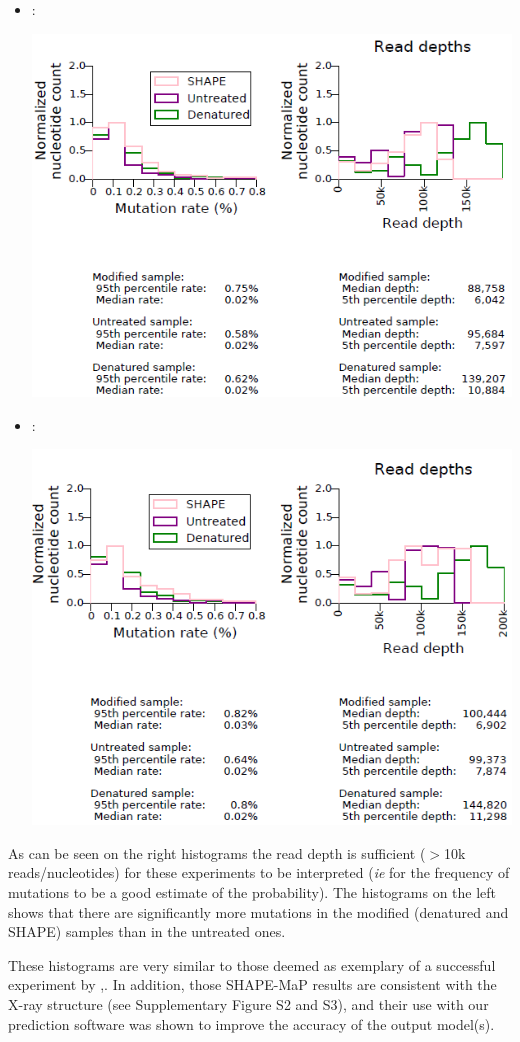 \documentclass[9pt,hyperref]{article} %
\begin{document}
\begin{enumerate}
{\begin{itemize}
	\item \NMIAMg:

	{\centering\includegraphics[width=.8\linewidth]{graphs/didy/NMIA-Mg}\\}

	\item \OneMSevILUThree:
	
	{\centering\includegraphics[width=.8\linewidth]{graphs/didy/1M7}\\}

	\end{itemize}
	
	As can be seen on the right  histograms the read depth is sufficient ($>$10k reads/nucleotides) for these experiments to be interpreted (\emph{ie} for the frequency of mutations to be a good estimate of the probability). The histograms on the left shows that there are significantly more mutations in the modified (denatured and SHAPE) samples than in the untreated ones. 
	
	These histograms are very similar to those deemed as exemplary of a successful experiment by \cite{Smola2015},. 
	In addition, those SHAPE-MaP results are consistent with the X-ray structure (see Supplementary Figure S2 and S3), and their use with our prediction software was shown to improve the accuracy of the output model(s). 
	
}
\end{enumerate}
\end{document}
